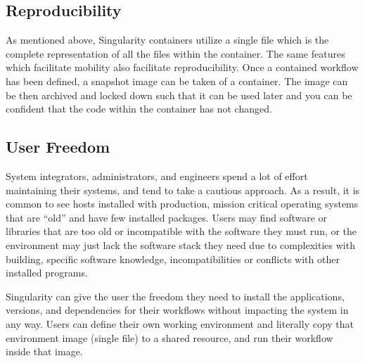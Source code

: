 \documentclass[letterpaper,10pt,english]{sphinxmanual}
\begin{document}
\subsection{Reproducibility}
\label{\detokenize{introduction:reproducibility}}
As mentioned above, Singularity containers utilize a single file which is the complete
representation of all the files within the container. The same
features which facilitate mobility also facilitate reproducibility.
Once a contained workflow has been defined, a snapshot image can be taken of a container.
The image can be then archived and locked down such that it can be used later
and you can be confident that the code within the container has not
changed.


\subsection{User Freedom}
\label{\detokenize{introduction:user-freedom}}
System integrators, administrators, and engineers spend a lot
of effort maintaining their systems, and tend to take a cautious
approach. As a result, it is common to see hosts installed with
production, mission critical operating systems that are “old” and have
few installed packages. Users may find software or libraries that are
too old or incompatible with the software they must run, or the
environment may just lack the software stack they need due to
complexities with building, specific software knowledge,
incompatibilities or conflicts with other installed programs.

Singularity can give the user the freedom they need to install the
applications, versions, and dependencies for their workflows without
impacting the system in any way. Users can define their own working
environment and literally copy that environment image (single file) to
a shared resource, and run their workflow inside that image.
\end{document}
